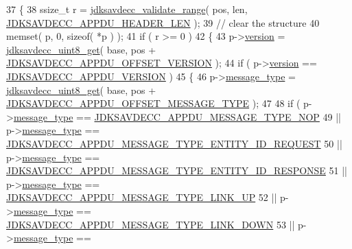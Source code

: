 \begin{DoxyCode}
37 \{
38     ssize\_t r = \hyperlink{group__util_ga9c02bdfe76c69163647c3196db7a73a1}{jdksavdecc\_validate\_range}( pos, len, 
      \hyperlink{group__appdu__offset_ga49c3326fdd0ad29a909e22f0945f2627}{JDKSAVDECC\_APPDU\_HEADER\_LEN} );
39     \textcolor{comment}{// clear the structure}
40     memset( p, 0, \textcolor{keyword}{sizeof}( *p ) );
41     \textcolor{keywordflow}{if} ( r >= 0 )
42     \{
43         p->\hyperlink{structjdksavdecc__appdu_ab22abc2906422da61885ac6c8e6a1a59}{version} = \hyperlink{group__endian_ga27091e0bf32429d162f641a3f4bc933f}{jdksavdecc\_uint8\_get}( base, pos + 
      \hyperlink{group__appdu__offset_ga57b98282f7ecf5cc47f57d7398d6f07c}{JDKSAVDECC\_APPDU\_OFFSET\_VERSION} );
44         \textcolor{keywordflow}{if} ( p->\hyperlink{structjdksavdecc__appdu_ab22abc2906422da61885ac6c8e6a1a59}{version} == \hyperlink{group__appdu__constants_ga56dc385655e74f514e98341140261880}{JDKSAVDECC\_APPDU\_VERSION} )
45         \{
46             p->\hyperlink{structjdksavdecc__appdu_aeaaffeace8c23899e558022f62ce6de4}{message\_type} = \hyperlink{group__endian_ga27091e0bf32429d162f641a3f4bc933f}{jdksavdecc\_uint8\_get}( base, pos + 
      \hyperlink{group__appdu__offset_ga13a78a093e9df487a35d7d57589eab98}{JDKSAVDECC\_APPDU\_OFFSET\_MESSAGE\_TYPE} );
47 
48             \textcolor{keywordflow}{if} ( p->\hyperlink{structjdksavdecc__appdu_aeaaffeace8c23899e558022f62ce6de4}{message\_type} == 
      \hyperlink{group__appdu__constants_ga5046c58fc443b2e4ceff64635aa0ba8c}{JDKSAVDECC\_APPDU\_MESSAGE\_TYPE\_NOP}
49                  || p->\hyperlink{structjdksavdecc__appdu_aeaaffeace8c23899e558022f62ce6de4}{message\_type} == 
      \hyperlink{group__appdu__constants_ga40c5d416d1df11d372c6695142d7c051}{JDKSAVDECC\_APPDU\_MESSAGE\_TYPE\_ENTITY\_ID\_REQUEST}
50                  || p->\hyperlink{structjdksavdecc__appdu_aeaaffeace8c23899e558022f62ce6de4}{message\_type} == 
      \hyperlink{group__appdu__constants_ga81d2ca33e293bd267fbaf74406a45c5b}{JDKSAVDECC\_APPDU\_MESSAGE\_TYPE\_ENTITY\_ID\_RESPONSE}
51                  || p->\hyperlink{structjdksavdecc__appdu_aeaaffeace8c23899e558022f62ce6de4}{message\_type} == 
      \hyperlink{group__appdu__constants_gadae986916259f4936988bc0558770831}{JDKSAVDECC\_APPDU\_MESSAGE\_TYPE\_LINK\_UP}
52                  || p->\hyperlink{structjdksavdecc__appdu_aeaaffeace8c23899e558022f62ce6de4}{message\_type} == 
      \hyperlink{group__appdu__constants_ga8bf2da1e0f552a7ee69e8c75083e1615}{JDKSAVDECC\_APPDU\_MESSAGE\_TYPE\_LINK\_DOWN}
53                  || p->\hyperlink{structjdksavdecc__appdu_aeaaffeace8c23899e558022f62ce6de4}{message\_type} == 

\end{DoxyCode}
